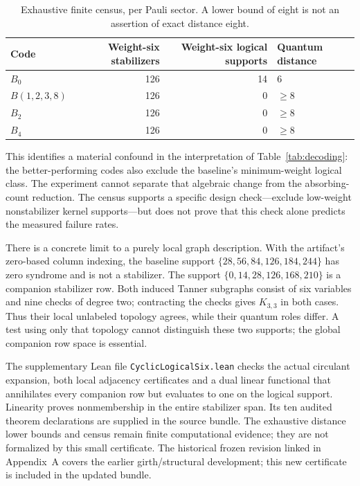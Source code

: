 \documentclass[11pt]{article}
\theoremstyle{definition}
\theoremstyle{remark}
\begin{document}
\begin{table}[ht]
\centering\small
\begin{tabular}{lrrl}
\toprule
Code & Weight-six stabilizers & Weight-six logical supports & Quantum distance \\
\midrule
$B_0$ & 126 & 14 & $6$ \\
$B(1,2,3,8)$ & 126 & 0 & $\geq8$ \\
$B_2$ & 126 & 0 & $\geq8$ \\
$B_4$ & 126 & 0 & $\geq8$ \\
\bottomrule
\end{tabular}
\caption{Exhaustive finite census, per Pauli sector. A lower bound of eight
is not an assertion of exact distance eight.}
\label{tab:logical-six}
\end{table}

This identifies a material confound in the interpretation of
Table~\ref{tab:decoding}: the better-performing codes also exclude the
baseline's minimum-weight logical class. The experiment cannot separate
that algebraic change from the absorbing-count reduction. The census
supports a specific design check---exclude low-weight nonstabilizer kernel
supports---but does not prove that this check alone predicts the measured
failure rates.

There is a concrete limit to a purely local graph description. With the
artifact's zero-based column indexing, the baseline support
$\{28,56,84,126,184,244\}$ has zero syndrome and is not a stabilizer.
The support $\{0,14,28,126,168,210\}$ is a companion stabilizer row.
Both induced Tanner subgraphs consist of six variables and nine
checks of degree two; contracting the checks gives $K_{3,3}$ in both
cases. Thus their local unlabeled topology agrees, while their quantum
roles differ. A test using only that topology cannot distinguish these
two supports; the global companion row space is essential.

The supplementary Lean file \texttt{CyclicLogicalSix.lean} checks the
actual circulant expansion, both local adjacency certificates and a dual
linear functional that annihilates every companion row but evaluates to
one on the logical support. Linearity proves nonmembership in the entire
stabilizer span. Its ten audited theorem declarations are supplied in the
source bundle. The exhaustive distance lower bounds and census remain
finite computational evidence; they are not formalized by this small
certificate. The historical frozen revision linked in Appendix~A covers
the earlier girth/structural development; this new certificate is included
in the updated bundle.
\end{document}
